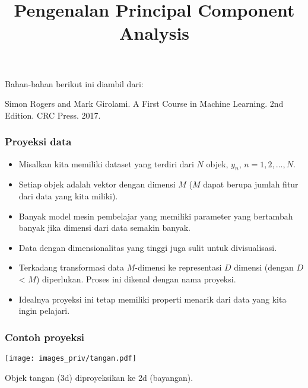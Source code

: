 \documentclass[bahasa,11pt,aspectratio=169]{beamer}
\begin{document}
\title{Pengenalan Principal Component Analysis}
\date{} %

\frame{\titlepage}


\begin{frame}

Bahan-bahan berikut ini diambil dari:

Simon Rogers and Mark Girolami. A First Course in Machine Learning. 2nd Edition.
CRC Press. 2017.

\end{frame}

\begin{frame}
\frametitle{Proyeksi data}

\begin{itemize}
\item Misalkan kita memiliki dataset yang terdiri dari $N$ objek, $y_{n}$, $n=1,2,\ldots,N$.
%
\item Setiap objek adalah vektor dengan dimensi $M$ ($M$ dapat berupa jumlah fitur dari
data yang kita miliki).
%
\item Banyak model mesin pembelajar yang memiliki parameter yang bertambah banyak jika
dimensi dari data semakin banyak.
%
\item Data dengan dimensionalitas yang tinggi juga sulit untuk divisualisasi.
%
\item Terkadang transformasi data $M$-dimensi ke representasi $D$ dimensi (dengan $D$ < $M$)
diperlukan. Proses ini dikenal dengan nama proyeksi.
%
\item Idealnya proyeksi ini tetap memiliki properti menarik dari data yang kita
ingin pelajari.
\end{itemize}

\end{frame}




\begin{frame}[fragile]
\frametitle{Contoh proyeksi}

\begin{center}
\texttt{[image: images\_priv/tangan.pdf]}
\end{center}

Objek tangan (3d) diproyeksikan ke 2d (bayangan).

\end{frame}
\end{document}

